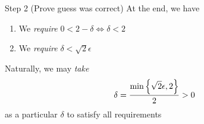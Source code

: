 \documentclass{beamer}
\begin{document}
\begin{frame}{Step 2 (Prove guess was correct)}
At the end, we have
\begin{enumerate}
\item We \textit{require} $0<2-\delta\iff \delta<2$
\item We \textit{require} $\delta<\sqrt{2}\epsilon$
\end{enumerate}
Naturally, we may \textit{take}
\[\delta=\frac{\min\mycbra{\sqrt{2}\epsilon,2}}{2}>0\]
as a particular $\delta$ to satisfy all requirements
\end{frame}

%
%
%
%
%
\end{document}
